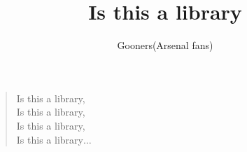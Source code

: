 \documentclass[a4paper,12pt]{article}
\title{Is this a library}
\author{Gooners(Arsenal fans)}
\date{}
\begin{document}
	
	\maketitle
	
	\begin{verse}
		
		Is this a library, \\
		Is this a library, \\
		Is this a library, \\
		Is this a library$\ldots$
		
	\end{verse}
	
\end{document}
